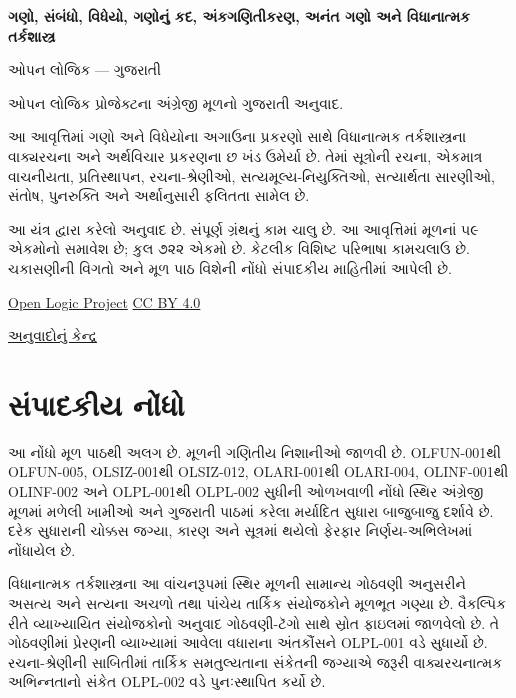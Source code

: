 \begin{titlepage}
{\Huge\bfseries ગણો, સંબંધો, વિધેયો, ગણોનું કદ, અંકગણિતીકરણ,
અનંત ગણો અને વિધાનાત્મક તર્કશાસ્ત્ર\par}
\vspace{1em}
{\Large ઓપન લોજિક — ગુજરાતી\par}
\vspace{2em}
ઓપન લોજિક પ્રોજેક્ટના અંગ્રેજી મૂળનો ગુજરાતી અનુવાદ.\par
\vspace{1em}
આ આવૃત્તિમાં ગણો અને વિધેયોના અગાઉના પ્રકરણો સાથે વિધાનાત્મક
તર્કશાસ્ત્રના વાક્યરચના અને અર્થવિચાર પ્રકરણના છ ખંડ ઉમેર્યા છે.
તેમાં સૂત્રોની રચના, એકમાત્ર વાચનીયતા, પ્રતિસ્થાપન, રચના-શ્રેણીઓ,
સત્યમૂલ્ય-નિયુક્તિઓ, સત્યાર્થતા સારણીઓ, સંતોષ, પુનરુક્તિ અને
અર્થાનુસારી ફલિતતા સામેલ છે.\par
\vfill
આ યંત્ર દ્વારા કરેલો અનુવાદ છે. સંપૂર્ણ ગ્રંથનું કામ ચાલુ છે.
આ આવૃત્તિમાં મૂળનાં ૫૯ એકમોનો સમાવેશ છે; કુલ ૭૨૨ એકમો છે.
કેટલીક વિશિષ્ટ પરિભાષા કામચલાઉ છે. ચકાસણીની વિગતો અને
મૂળ પાઠ વિશેની નોંધો સંપાદકીય માહિતીમાં આપેલી છે.\par
\vspace{1em}
\href{https://github.com/OpenLogicProject/OpenLogic}{Open Logic Project}
\quad \href{https://creativecommons.org/licenses/by/4.0/}{CC BY 4.0}\par
\href{https://github.com/KokunoYumeto/OpenLogic-translations}{અનુવાદોનું કેન્દ્ર}\par
\end{titlepage}
\tableofcontents
\clearpage

\clearpage
\section*{સંપાદકીય નોંધો}
આ નોંધો મૂળ પાઠથી અલગ છે. મૂળની ગણિતીય નિશાનીઓ જાળવી છે.
OLFUN-001થી OLFUN-005, OLSIZ-001થી OLSIZ-012, OLARI-001થી
OLARI-004, OLINF-001થી OLINF-002 અને OLPL-001થી OLPL-002 સુધીની
ઓળખવાળી નોંધો સ્થિર અંગ્રેજી મૂળમાં મળેલી ખામીઓ અને ગુજરાતી પાઠમાં
કરેલા મર્યાદિત સુધારા બાજુબાજુ દર્શાવે છે. દરેક સુધારાની ચોક્કસ
જગ્યા, કારણ અને સૂત્રમાં થયેલો ફેરફાર નિર્ણય-અભિલેખમાં નોંધાયેલ છે.

વિધાનાત્મક તર્કશાસ્ત્રના આ વાંચનરૂપમાં સ્થિર મૂળની સામાન્ય ગોઠવણી
અનુસરીને અસત્ય અને સત્યના અચળો તથા પાંચેય તાર્કિક સંયોજકોને મૂળભૂત
ગણ્યા છે. વૈકલ્પિક રીતે વ્યાખ્યાયિત સંયોજકોનો અનુવાદ ગોઠવણી-ટૅગો સાથે
સ્રોત ફાઇલમાં જાળવેલો છે. તે ગોઠવણીમાં પ્રેરણની વ્યાખ્યામાં આવેલા
વધારાના અંતકૌંસને OLPL-001 વડે સુધાર્યો છે. રચના-શ્રેણીની સાબિતીમાં
તાર્કિક સમતુલ્યતાના સંકેતની જગ્યાએ જરૂરી વાક્યરચનાત્મક અભિન્નતાનો
સંકેત OLPL-002 વડે પુનઃસ્થાપિત કર્યો છે.

